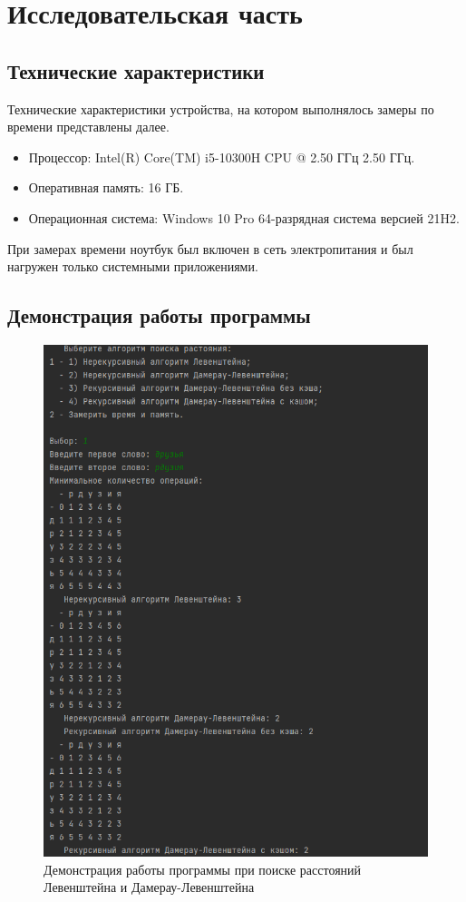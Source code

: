 \chapter{Исследовательская часть}

\section{Технические характеристики}

Технические характеристики устройства, на котором выполнялось замеры по времени представлены далее.

\begin{itemize}
	\item Процессор: Intel(R) Core(TM) i5-10300H CPU @ 2.50 ГГц 2.50 ГГц.
	\item Оперативная память: 16 ГБ.
	\item Операционная система: Windows 10 Pro 64-разрядная система версией 21H2.
\end{itemize}

При замерах времени ноутбук был включен в сеть электропитания и был нагружен только системными приложениями.

\section{Демонстрация работы программы}

\begin{figure}[h]
	\centering
	\includegraphics[height=0.4\textheight]{img/example.png}
	\caption{Демонстрация работы программы при поиске расстояний Левенштейна и Дамерау-Левенштейна}
	\label{img:demonstration}
\end{figure}

